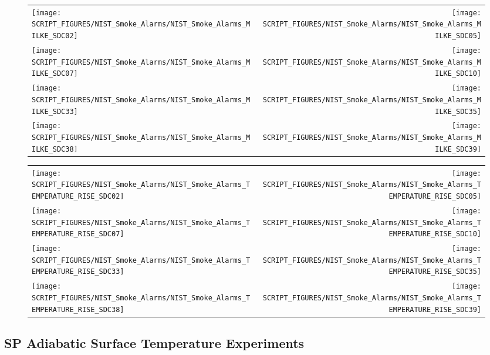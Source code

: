 \begin{figure}[!ht]
\begin{tabular*}{\textwidth}{l@{\extracolsep{\fill}}r}
\texttt{[image: SCRIPT\_FIGURES/NIST\_Smoke\_Alarms/NIST\_Smoke\_Alarms\_MILKE\_SDC02]} &
\texttt{[image: SCRIPT\_FIGURES/NIST\_Smoke\_Alarms/NIST\_Smoke\_Alarms\_MILKE\_SDC05]} \\
\texttt{[image: SCRIPT\_FIGURES/NIST\_Smoke\_Alarms/NIST\_Smoke\_Alarms\_MILKE\_SDC07]} &
\texttt{[image: SCRIPT\_FIGURES/NIST\_Smoke\_Alarms/NIST\_Smoke\_Alarms\_MILKE\_SDC10]} \\
\texttt{[image: SCRIPT\_FIGURES/NIST\_Smoke\_Alarms/NIST\_Smoke\_Alarms\_MILKE\_SDC33]} &
\texttt{[image: SCRIPT\_FIGURES/NIST\_Smoke\_Alarms/NIST\_Smoke\_Alarms\_MILKE\_SDC35]} \\
\texttt{[image: SCRIPT\_FIGURES/NIST\_Smoke\_Alarms/NIST\_Smoke\_Alarms\_MILKE\_SDC38]} &
\texttt{[image: SCRIPT\_FIGURES/NIST\_Smoke\_Alarms/NIST\_Smoke\_Alarms\_MILKE\_SDC39]}
\end{tabular*}
\end{figure}

\begin{figure}[!ht]
\begin{tabular*}{\textwidth}{l@{\extracolsep{\fill}}r}
\texttt{[image: SCRIPT\_FIGURES/NIST\_Smoke\_Alarms/NIST\_Smoke\_Alarms\_TEMPERATURE\_RISE\_SDC02]} &
\texttt{[image: SCRIPT\_FIGURES/NIST\_Smoke\_Alarms/NIST\_Smoke\_Alarms\_TEMPERATURE\_RISE\_SDC05]} \\
\texttt{[image: SCRIPT\_FIGURES/NIST\_Smoke\_Alarms/NIST\_Smoke\_Alarms\_TEMPERATURE\_RISE\_SDC07]} &
\texttt{[image: SCRIPT\_FIGURES/NIST\_Smoke\_Alarms/NIST\_Smoke\_Alarms\_TEMPERATURE\_RISE\_SDC10]} \\
\texttt{[image: SCRIPT\_FIGURES/NIST\_Smoke\_Alarms/NIST\_Smoke\_Alarms\_TEMPERATURE\_RISE\_SDC33]} &
\texttt{[image: SCRIPT\_FIGURES/NIST\_Smoke\_Alarms/NIST\_Smoke\_Alarms\_TEMPERATURE\_RISE\_SDC35]} \\
\texttt{[image: SCRIPT\_FIGURES/NIST\_Smoke\_Alarms/NIST\_Smoke\_Alarms\_TEMPERATURE\_RISE\_SDC38]} &
\texttt{[image: SCRIPT\_FIGURES/NIST\_Smoke\_Alarms/NIST\_Smoke\_Alarms\_TEMPERATURE\_RISE\_SDC39]}
\end{tabular*}
\end{figure}

\clearpage

\subsection{SP Adiabatic Surface Temperature Experiments}

